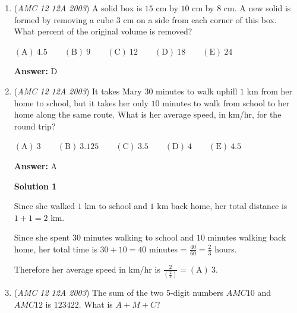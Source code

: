 \begin{enumerate}
Since T-shirts cost $5$ dollars more than a pair of socks, T-shirts cost $5+4=9$ dollars. 

 Since each member needs $2$ pairs of socks and $2$ T-shirts, the total cost for $1$ member is $2(4+9)=26$ dollars. 

 Since $2366$ dollars was the cost for the club, and $26$ was the cost per member, the number of members in the League is $2366\div 26=\boxed{\mathrm{(B)}\ 91}$. 

 \href{https://drive.google.com/file/d/1tU\_HmCUMWZ-DMsGcz\_7wLy8tniXDh0q0/view?usp=drivesdk}{https://drive.google.com/file/d/1tU\_HmCUMWZ-DMsGcz\_7wLy8tniXDh0q0/view?usp=drivesdk}

 


	\item (\textit{AMC 12 12A 2003}) A solid box is $15$ cm by $10$ cm by $8$ cm. A new solid is formed by removing a cube $3$ cm on a side from each corner of this box. What percent of the original volume is removed? 


 $\mathrm{(A) \ } 4.5\qquad \mathrm{(B) \ } 9\qquad \mathrm{(C) \ } 12\qquad \mathrm{(D) \ } 18\qquad \mathrm{(E) \ } 24$

 \textbf{Answer: }D


	\item (\textit{AMC 12 12A 2003}) It takes Mary $30$ minutes to walk uphill $1$ km from her home to school, but it takes her only $10$ minutes to walk from school to her home along the same route. What is her average speed, in km/hr, for the round trip? 


 $\mathrm{(A) \ } 3\qquad \mathrm{(B) \ } 3.125\qquad \mathrm{(C) \ } 3.5\qquad \mathrm{(D) \ } 4\qquad \mathrm{(E) \ } 4.5$

 \textbf{Answer: }A



\textbf{Solution 1}

Since she walked $1$ km to school and $1$ km back home, her total distance is $1+1=2$ km. 

 Since she spent $30$ minutes walking to school and $10$ minutes walking back home, her total time is $30+10=40$ minutes = $\frac{40}{60}=\frac{2}{3}$ hours. 

 Therefore her average speed in km/hr is $\frac{2}{\left(\frac{2}{3}\right)}=\boxed{\mathrm{(A)}\ 3}$.

 


	\item (\textit{AMC 12 12A 2003}) The sum of the two 5-digit numbers $AMC10$ and $AMC12$ is $123422$. What is $A+M+C$? 



\end{enumerate}
